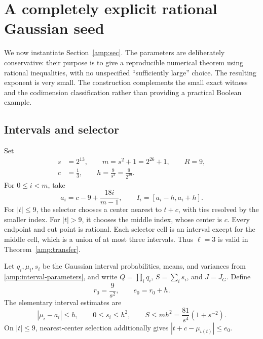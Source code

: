 \section{A completely explicit rational Gaussian seed}
\label{gaussian:sec}

We now instantiate Section~\ref{amp:sec}.  The parameters are deliberately
conservative: their purpose is to give a reproducible numerical theorem
using rational inequalities, with no unspecified ``sufficiently large''
choice.  The resulting exponent is very small.  The construction complements
the small exact witness and the codimension classification rather than
providing a practical Boolean example.

\subsection{Intervals and selector}

Set
\begin{equation}
 \begin{aligned}
 s&=2^{13},\qquad m=s^2+1=2^{26}+1,\qquad R=9,\\
 c&=\frac13,\qquad h=\frac9{s^3}=\frac9{2^{39}}.
 \end{aligned}
 \label{gaussian:parameters}
\end{equation}
For $0\le i<m$, take
\begin{equation}
 a_i=c-9+\frac{18i}{m-1},\qquad I_i=[a_i-h,a_i+h].
 \label{gaussian:intervals}
\end{equation}
For $|t|\le9$, the selector chooses a center nearest to $t+c$, with
ties resolved by the smaller index.  For $|t|>9$, it chooses the middle
index, whose center is $c$.  Every endpoint and cut point is rational.
Each selector cell is an interval except for the middle cell, which is
a union of at most three intervals.  Thus $\ell=3$ is valid in
Theorem~\ref{amp:transfer}.

Let $q_i,\mu_i,s_i$ be the Gaussian interval probabilities, means, and
variances from \eqref{amp:interval-parameters}, and write
$Q=\prod_iq_i$, $S=\sum_i s_i$, and $J=J_G$.  Define
\[
 r_0=\frac9{s^2},\qquad e_0=r_0+h.
\]
The elementary interval estimates are
\begin{equation}
 |\mu_i-a_i|\le h,\qquad 0\le s_i\le h^2,\qquad
 S\le mh^2=\frac{81}{s^4}(1+s^{-2}).
 \label{gaussian:interval-estimates}
\end{equation}
On $|t|\le9$, nearest-center selection additionally gives
$|t+c-\mu_{\iota(t)}|\le e_0$.

